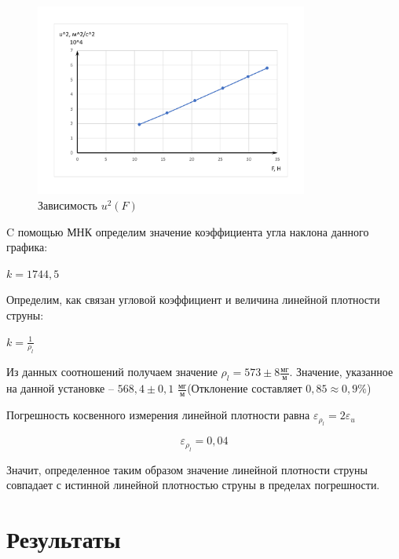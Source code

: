 \documentclass[12pt,a4paper]{article}
\begin{document}
\begin{figure}[h!]
	\begin{center}
		\includegraphics[width = 0.8\textwidth]{graph}
		\caption{Зависимость $u^{2}\left(F\right)$}
		\label{fig:u_sqr_depends_of_force}
	\end{center}
\end{figure}

C помощью МНК определим значение коэффициента угла наклона данного графика:

$ k = 1744,5$

Определим, как связан угловой коэффициент и величина линейной плотности струны:

$k = \frac{1}{\rho_{l}}$

Из данных соотношений получаем значение $\rho_{l} = 573 \pm 8 \frac{\text{мг}}{\text{м}}$. Значение, указанное на данной установке -- $568,4 \pm 0,1$  $\frac{\text{мг}}{\text{м}}$(Отклонение составляет $0,85 \approx 0,9 \%$)

Погрешность косвенного измерения линейной плотности равна $\varepsilon_{\rho_{l}} = 2\varepsilon_{u}$

$$ \varepsilon_{\rho_{l}} = 0,04$$ 

Значит, определенное таким образом значение линейной плотности струны совпадает с истинной линейной плотностью струны в пределах погрешности.

\section{Результаты}
\end{document}
